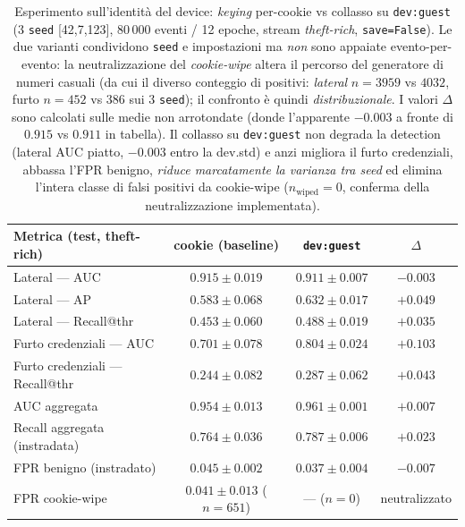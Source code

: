 \documentclass[11pt,a4paper]{report}
\begin{document}
\begin{table}[ht!]
\centering
\renewcommand{\arraystretch}{1.4}
\begin{tabular}{l c c c}
\hline
\textbf{Metrica (test, theft-rich)} & \textbf{cookie (baseline)} & \textbf{\texttt{dev:guest}} & $\Delta$ \\
\hline
Lateral --- AUC                  & $0.915\pm0.019$ & $0.911\pm0.007$ & $-0.003$ \\
Lateral --- AP                   & $0.583\pm0.068$ & $\mathbf{0.632}\pm0.017$ & $+0.049$ \\
Lateral --- Recall@thr           & $0.453\pm0.060$ & $\mathbf{0.488}\pm0.019$ & $+0.035$ \\
\hline
Furto credenziali --- AUC        & $0.701\pm0.078$ & $\mathbf{0.804}\pm0.024$ & $+0.103$ \\
Furto credenziali --- Recall@thr & $0.244\pm0.082$ & $\mathbf{0.287}\pm0.062$ & $+0.043$ \\
\hline
AUC aggregata                    & $0.954\pm0.013$ & $\mathbf{0.961}\pm0.001$ & $+0.007$ \\
Recall aggregata (instradata)    & $0.764\pm0.036$ & $\mathbf{0.787}\pm0.006$ & $+0.023$ \\
FPR benigno (instradato)         & $0.045\pm0.002$ & $\mathbf{0.037}\pm0.004$ & $-0.007$ \\
FPR cookie-wipe                  & $0.041\pm0.013$ ($n{=}651$) & --- ($n{=}0$) & neutralizzato \\
\hline
\end{tabular}
\caption{Esperimento sull'identità del device: \textit{keying} per-cookie vs collasso su \texttt{dev:guest} (3 \texttt{seed} [42,7,123], 80\,000 eventi / 12 epoche, stream \emph{theft-rich}, \texttt{save=False}). Le due varianti condividono \texttt{seed} e impostazioni ma \emph{non} sono appaiate evento-per-evento: la neutralizzazione del \textit{cookie-wipe} altera il percorso del generatore di numeri casuali (da cui il diverso conteggio di positivi: \textit{lateral} $n{=}3959$ vs $4032$, furto $n{=}452$ vs $386$ sui 3 \texttt{seed}); il confronto è quindi \emph{distribuzionale}. I valori $\Delta$ sono calcolati sulle medie non arrotondate (donde l'apparente $-0.003$ a fronte di $0.915$ vs $0.911$ in tabella). Il collasso su \texttt{dev:guest} non degrada la detection (lateral AUC piatto, $-0.003$ entro la dev.std) e anzi migliora il furto credenziali, abbassa l'FPR benigno, \emph{riduce marcatamente la varianza tra seed} ed elimina l'intera classe di falsi positivi da cookie-wipe ($n_{\text{wiped}}{=}0$, conferma della neutralizzazione implementata).}
\label{tab:guestdev}
\end{table}
\end{document}

